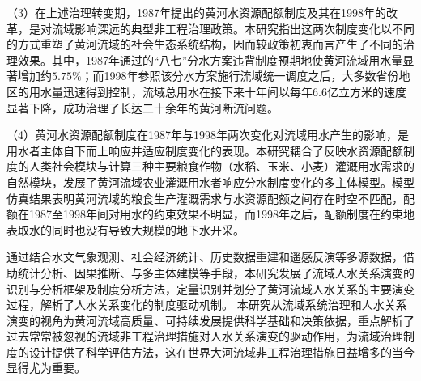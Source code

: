 \begin{cabstract}
（3）在上述治理转变期，1987年提出的黄河水资源配额制度及其在1998年的改革，是对流域影响深远的典型非工程治理政策。本研究指出这两次制度变化以不同的方式重塑了黄河流域的社会\textendash{}生态系统结构，因而较政策初衷而言产生了不同的治理效果。其中，1987年通过的“八七”分水方案违背制度预期地使黄河流域用水量显著增加约$5.75\%$；而1998年参照该分水方案施行流域统一调度之后，大多数省份地区的用水量迅速得到控制，流域总用水在接下来十年间以每年6.6亿立方米的速度显著下降，成功治理了长达二十余年的黄河断流问题。

（4）黄河水资源配额制度在1987年与1998年两次变化对流域用水产生的影响，是用水者主体自下而上响应并适应制度变化的表现。本研究耦合了反映水资源配额制度的人类社会模块与计算三种主要粮食作物（水稻、玉米、小麦）灌溉用水需求的自然模块，发展了黄河流域农业灌溉用水者响应分水制度变化的多主体模型。模型仿真结果表明黄河流域的粮食生产灌溉需求与水资源配额之间存在时空不匹配，配额在1987至1998年间对用水的约束效果不明显，而1998年之后，配额制度在约束地表取水的同时也没有导致大规模的地下水开采。

通过结合水文气象观测、社会经济统计、历史数据重建和遥感反演等多源数据，借助统计分析、因果推断、与多主体建模等手段，本研究发展了流域人\textendash{}水关系演变的识别与分析框架及制度分析方法，定量识别并划分了黄河流域人\textendash{}水关系的主要演变过程，解析了人\textendash{}水关系变化的制度驱动机制。
本研究从流域系统治理和人\textendash{}水关系演变的视角为黄河流域高质量、可持续发展提供科学基础和决策依据，重点解析了过去常常被忽视的流域非工程治理措施对人\textendash{}水关系演变的驱动作用，为流域治理制度的设计提供了科学评估方法，这在世界大河流域非工程治理措施日益增多的当今显得尤为重要。


\end{cabstract}



